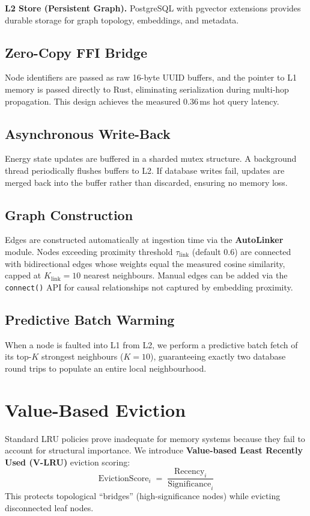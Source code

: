 \documentclass[11pt]{article}
\begin{document}
\textbf{L2 Store (Persistent Graph).} PostgreSQL with pgvector
extensions provides durable storage for graph topology, embeddings, and
metadata.

\subsection{Zero-Copy FFI Bridge}
Node identifiers are passed as raw 16-byte UUID buffers, and the pointer
to L1 memory is passed directly to Rust, eliminating serialization
during multi-hop propagation. This design achieves the measured
0.36\,ms hot query latency.

\subsection{Asynchronous Write-Back}
Energy state updates are buffered in a sharded mutex structure. A
background thread periodically flushes buffers to L2. If database writes
fail, updates are merged back into the buffer rather than discarded,
ensuring no memory loss.

\subsection{Graph Construction}
Edges are constructed automatically at ingestion time via the
\textbf{AutoLinker} module. Nodes exceeding proximity threshold
$\tau_{\text{link}}$ (default $0.6$) are connected with bidirectional
edges whose weights equal the measured cosine similarity, capped at
$K_{\text{link}} = 10$ nearest neighbours. Manual edges can be added
via the \texttt{connect()} API for causal relationships not captured by
embedding proximity.

\subsection{Predictive Batch Warming}
When a node is faulted into L1 from L2, we perform a predictive batch
fetch of its top-$K$ strongest neighbours ($K = 10$), guaranteeing
exactly two database round trips to populate an entire local
neighbourhood.

\section{Value-Based Eviction}

Standard LRU policies prove inadequate for memory systems because they
fail to account for structural importance. We introduce
\textbf{Value-based Least Recently Used (V-LRU)} eviction scoring:
\begin{equation}
  \operatorname{EvictionScore}_i
  = \frac{\operatorname{Recency}_i}{\operatorname{Significance}_i}
\end{equation}
This protects topological ``bridges'' (high-significance nodes) while
evicting disconnected leaf nodes.
\end{document}
